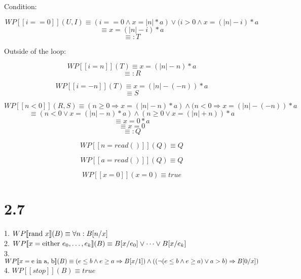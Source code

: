 \documentclass{article}
\begin{document}
Condition:

$$ WP[\![i==0]\!](U, I) \equiv (i==0 \land x=|n|*a) \lor (i>0 \land x=(|n|-i)*a $$
$$ \equiv x=(|n|-i)*a $$
$$ \equiv: T $$

Outside of the loop:

$$ WP[\![i=n]\!](T) \equiv x=(|n|-n)*a $$
$$ \equiv: R $$

$$ WP[\![i=-n]\!](T) \equiv x=(|n|-(-n))*a $$
$$ \equiv S $$

$$ WP [\![n<0]\!](R, S) \equiv (n \ge 0 \Rightarrow x=(|n|-n)*a) \land (n < 0 \Rightarrow x=(|n|-(-n))*a $$
$$ \equiv (n<0 \lor x=(|n|-n)*a) \land (n \ge 0 \lor x=(|n|+n))*a $$
$$ \equiv x=0*a $$
$$ \equiv x=0 $$
$$ \equiv: Q $$

$$ WP[\![n=read()]\!](Q) \equiv Q $$

$$ WP[\![a=read()]\!](Q) \equiv Q $$

$$ WP[\![x=0]\!](x=0) \equiv true $$

\section*{2.7}

1. $ WP[\![\hbox{rand }x]\!](B) \equiv \forall n: B[n/x] $ \\
2. $ WP[\![x=\hbox{either }e_{0}, \dots, e_{k}]\!](B) \equiv B[x/e_{0}] \lor \dots \lor B[x/e_{k}] $ \\
3. $ WP[\![x=\hbox{e in a, b}]\!](B) \equiv (e \le b \land e \ge a \Rightarrow B[x/1]) \land ((\neg (e \le b \land e \ge a) \lor a>b) \Rightarrow B[0/x]) $ \\
4. $ WP[\![stop]\!](B) \equiv true $
\end{document}
